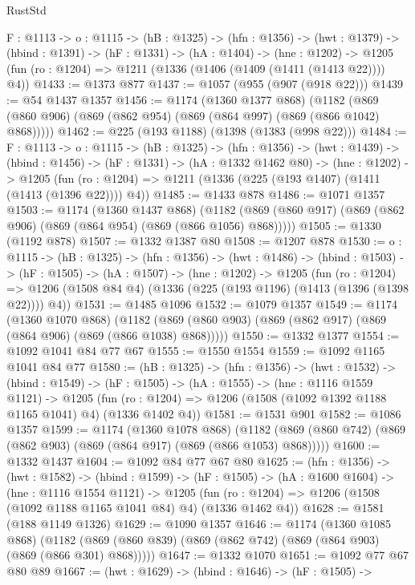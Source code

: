 \begin{lexlean}{RustStd}
\begin{coremodule}
  {F : @1113} ->
  {o : @1115} ->
  (hB : @1325) ->
  (hfn : @1356) ->
  (hwt : @1379) ->
  (hbind : @1391) ->
  (hF : @1331) ->
  (hA : @1404) ->
  (hne : @1202) -> @1205 (fun (ro : @1204) => @1211 (@1336 (@1406 (@1409 (@1411 (@1413 @22)))) @4))
@1433 := @1373 @877
@1437 := @1057 (@955 (@907 (@918 @22)))
@1439 := @54 @1437 @1357
@1456 := @1174
    (@1360 @1377 @868)
    (@1182 (@869 (@860 @906) (@869 (@862 @954) (@869 (@864 @997) (@869 (@866 @1042) @868)))))
@1462 := @225 (@193 @1188) (@1398 (@1383 (@998 @22)))
@1484 := {F : @1113} ->
  {o : @1115} ->
  (hB : @1325) ->
  (hfn : @1356) ->
  (hwt : @1439) ->
  (hbind : @1456) ->
  (hF : @1331) ->
  (hA : @1332 @1462 @80) ->
  (hne : @1202) ->
  @1205 (fun (ro : @1204) => @1211 (@1336 (@225 (@193 @1407) (@1411 (@1413 (@1396 @22)))) @4))
@1485 := @1433 @878
@1486 := @1071 @1357
@1503 := @1174
    (@1360 @1437 @868)
    (@1182 (@869 (@860 @917) (@869 (@862 @906) (@869 (@864 @954) (@869 (@866 @1056) @868)))))
@1505 := @1330 (@1192 @878)
@1507 := @1332 @1387 @80
@1508 := @1207 @878
@1530 := {o : @1115} ->
  (hB : @1325) ->
  (hfn : @1356) ->
  (hwt : @1486) ->
  (hbind : @1503) ->
  (hF : @1505) ->
  (hA : @1507) ->
  (hne : @1202) ->
  @1205
    (fun (ro : @1204) =>
    @1206 (@1508 @84 @4) (@1336 (@225 (@193 @1196) (@1413 (@1396 (@1398 @22)))) @4))
@1531 := @1485 @1096
@1532 := @1079 @1357
@1549 := @1174
    (@1360 @1070 @868)
    (@1182 (@869 (@860 @903) (@869 (@862 @917) (@869 (@864 @906) (@869 (@866 @1038) @868)))))
@1550 := @1332 @1377
@1554 := @1092 @1041 @84 @77 @67
@1555 := @1550 @1554
@1559 := @1092 @1165 @1041 @84 @77
@1580 := (hB : @1325) ->
  (hfn : @1356) ->
  (hwt : @1532) ->
  (hbind : @1549) ->
  (hF : @1505) ->
  (hA : @1555) ->
  (hne : @1116 @1559 @1121) ->
  @1205 (fun (ro : @1204) => @1206 (@1508 (@1092 @1392 @1188 @1165 @1041) @4) (@1336 @1402 @4))
@1581 := @1531 @901
@1582 := @1086 @1357
@1599 := @1174
    (@1360 @1078 @868)
    (@1182 (@869 (@860 @742) (@869 (@862 @903) (@869 (@864 @917) (@869 (@866 @1053) @868)))))
@1600 := @1332 @1437
@1604 := @1092 @84 @77 @67 @80
@1625 := (hfn : @1356) ->
  (hwt : @1582) ->
  (hbind : @1599) ->
  (hF : @1505) ->
  (hA : @1600 @1604) ->
  (hne : @1116 @1554 @1121) ->
  @1205 (fun (ro : @1204) => @1206 (@1508 (@1092 @1188 @1165 @1041 @84) @4) (@1336 @1462 @4))
@1628 := @1581 (@188 @1149 @1326)
@1629 := @1090 @1357
@1646 := @1174
    (@1360 @1085 @868)
    (@1182 (@869 (@860 @839) (@869 (@862 @742) (@869 (@864 @903) (@869 (@866 @301) @868)))))
@1647 := @1332 @1070
@1651 := @1092 @77 @67 @80 @89
@1667 := (hwt : @1629) ->
  (hbind : @1646) ->
  (hF : @1505) ->

\end{coremodule}
\end{lexlean}
